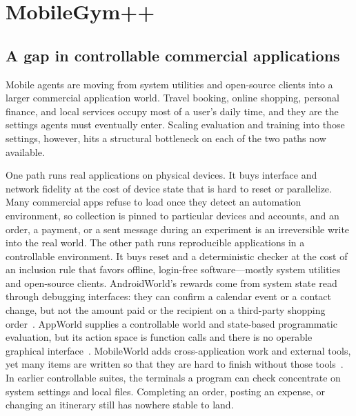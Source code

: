 \section{MobileGym++}
\label{sec:mobilegym++}
\label{sec:method}

\subsection{A gap in controllable commercial applications}
\label{sec:mgpp-env}

Mobile agents are moving from system utilities and open-source clients into a larger commercial application world. Travel booking, online shopping, personal finance, and local services occupy most of a user's daily time, and they are the settings agents must eventually enter. Scaling evaluation and training into those settings, however, hits a structural bottleneck on each of the two paths now available.

One path runs real applications on physical devices. It buys interface and network fidelity at the cost of device state that is hard to reset or parallelize. Many commercial apps refuse to load once they detect an automation environment, so collection is pinned to particular devices and accounts, and an order, a payment, or a sent message during an experiment is an irreversible write into the real world. The other path runs reproducible applications in a controllable environment. It buys reset and a deterministic checker at the cost of an inclusion rule that favors offline, login-free software---mostly system utilities and open-source clients. AndroidWorld's rewards come from system state read through debugging interfaces: they can confirm a calendar event or a contact change, but not the amount paid or the recipient on a third-party shopping order~\citep{rawles2025androidworld}. AppWorld supplies a controllable world and state-based programmatic evaluation, but its action space is function calls and there is no operable graphical interface~\citep{trivedi2024appworld}. MobileWorld adds cross-application work and external tools, yet many items are written so that they are hard to finish without those tools~\citep{kong2025mobileworld}. In earlier controllable suites, the terminals a program can check concentrate on system settings and local files. Completing an order, posting an expense, or changing an itinerary still has nowhere stable to land.

